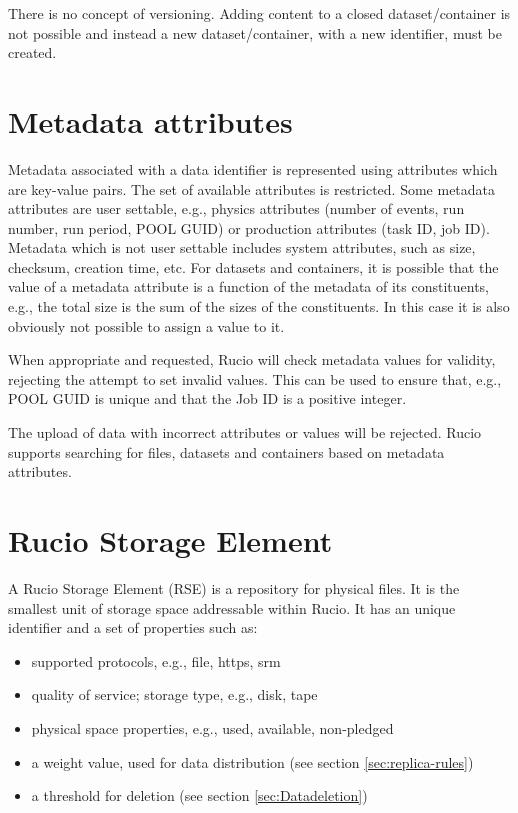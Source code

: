 \documentclass{atlasnote}
\begin{document}
\noindent There is no concept of versioning. Adding content to a closed dataset/container is not possible and instead a new dataset/container, with a new identifier, must be created.

\section{Metadata attributes}

Metadata associated with a data identifier is represented using attributes which are key-value pairs. The set of available attributes is restricted. Some metadata attributes are user settable, e.g., physics attributes (number of events, run number, run period, POOL GUID) or production attributes (task ID, job ID). Metadata which is not user settable includes system attributes, such as size, checksum, creation time, etc. For datasets and containers, it is possible that the value of a metadata attribute is a function of the metadata of its constituents, e.g., the total size is the sum of the sizes of the constituents. In this case it is also obviously not possible to assign a value to it.

When appropriate and requested, Rucio will check metadata values for validity, rejecting the attempt to set invalid values. This can be used to ensure that, e.g., POOL GUID is unique and that the Job ID is a positive integer.

The upload of data with incorrect attributes or values will be rejected. Rucio supports searching for files, datasets and containers based on metadata attributes.

\section{Rucio Storage Element}
\label{overview_Rucio_Storage_Element:rucio-storage-element}

A Rucio Storage Element (RSE) is a repository for physical files. It is the smallest unit of storage space addressable within Rucio. It has an unique identifier and a set of properties such as:

\begin{itemize}
\item supported protocols, e.g., file, https, srm
\item quality of service; storage type, e.g., disk, tape
\item physical space properties, e.g., used, available, non-pledged
\item a weight value, used for data distribution (see section \ref{sec:replica-rules})
\item a threshold for deletion (see section \ref{sec:Datadeletion})
\end{itemize}
\end{document}
